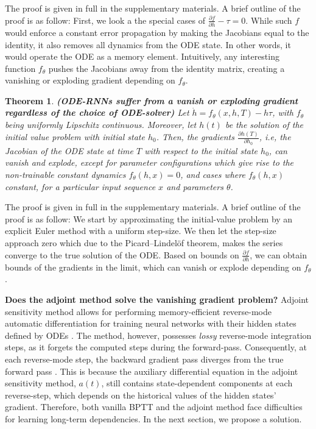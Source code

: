 \documentclass{article}
\newtheorem{theorem}{Theorem}
\begin{document}
The proof is given in full in the supplementary materials. A brief outline of the proof is as follow: 
First, we look a the special cases of $ \frac{\partial f}{\partial h}-\tau = 0$. While such $f$ would enforce a constant error propagation by making the Jacobians equal to the identity, it also removes all dynamics from the ODE state. In other words, it would operate the ODE as a memory element.
Intuitively, any interesting function $f_\theta$ pushes the Jacobians away from the identity matrix, creating a vanishing or exploding gradient depending on $f_\theta$.

\begin{theorem}
\label{thm:ode_solution}
\textbf{\emph{(ODE-RNNs suffer from a vanish or exploding gradient regardless of the choice of ODE-solver) }} 
    Let $\dot{h} = f_\theta(x,h,T) - h \tau$, with $f_\theta$ being uniformly Lipschitz continuous. 
    Moreover, let $h(t)$ be the solution of the initial value problem with initial state $h_0$.
    Then, the gradients $ \frac{\partial h(T)}{\partial h_0}$, i.e, the Jacobian of the ODE state at time $T$ with respect to the initial state $h_0$, can vanish and explode, except for parameter configurations which give rise to the non-trainable constant dynamics $f_\theta(h,x) = 0$, and cases where $f_\theta(h,x)$ constant, for a particular input sequence $x$ and parameters $\theta$.
\end{theorem}
The proof is given in full in the supplementary materials. A brief outline of the proof is as follow:
We start by approximating the initial-value problem by an explicit Euler method with a uniform step-size. 
We then let the step-size approach zero which due to the Picard–Lindelöf theorem, makes the series
converge to the true solution of the ODE.
Based on bounds on $\frac{\partial f}{\partial h}$, we can obtain bounds of the gradients in the limit, which can vanish or explode depending on $f_\theta$.

\textbf{Does the adjoint method solve the vanishing gradient problem?}
Adjoint sensitivity method \cite{pontryagin2018mathematical} allows for performing memory-efficient reverse-mode automatic differentiation for training neural networks with their hidden states defined by ODEs \cite{chen2018neural}. The method, however, possesses \emph{lossy} reverse-mode integration steps, as it forgets the computed steps during the forward-pass. Consequently, at each reverse-mode step, the backward gradient pass diverges from the true forward pass \cite{zhuang2020adaptive,gholami2019anode}. 
This is because the auxiliary differential equation in the adjoint sensitivity method, $a(t)$, still contains state-dependent components at each reverse-step, which depends on the historical values of the hidden states' gradient. Therefore, both vanilla BPTT and the adjoint method face difficulties for learning long-term dependencies. In the next section, we propose a solution. 
\end{document}
